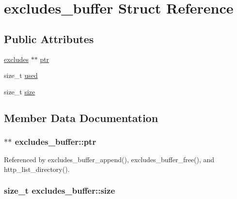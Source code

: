 \hypertarget{structexcludes__buffer}{\section{excludes\-\_\-buffer Struct Reference}
\label{structexcludes__buffer}
}
\subsection*{Public Attributes}
\begin{DoxyCompactItemize}
\item 
\hyperlink{structexcludes}{excludes} $\ast$$\ast$ \hyperlink{structexcludes__buffer_ac50fda5230342c3370383d9bc810d4a4}{ptr}
\item 
size\-\_\-t \hyperlink{structexcludes__buffer_ab9bca0c4a6ef3bd0908c0f3c22632576}{used}
\item 
size\-\_\-t \hyperlink{structexcludes__buffer_a56127d8957488658717cc92c6249c023}{size}
\end{DoxyCompactItemize}


\subsection{Member Data Documentation}
\hypertarget{structexcludes__buffer_ac50fda5230342c3370383d9bc810d4a4}{
\subsubsection[{ptr}]{$\ast$$\ast$ excludes\-\_\-buffer\-::ptr}}\label{structexcludes__buffer_ac50fda5230342c3370383d9bc810d4a4}


Referenced by excludes\-\_\-buffer\-\_\-append(), excludes\-\_\-buffer\-\_\-free(), and http\-\_\-list\-\_\-directory().

\hypertarget{structexcludes__buffer_a56127d8957488658717cc92c6249c023}{
\subsubsection[{size}]{\setlength{\rightskip}{0pt plus 5cm}size\-\_\-t excludes\-\_\-buffer\-::size}}\label{structexcludes__buffer_a56127d8957488658717cc92c6249c023}


